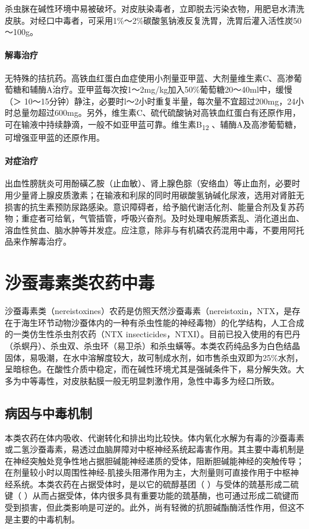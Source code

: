 杀虫脒在碱性环境中易被破坏。对皮肤染毒者，立即脱去污染衣物，用肥皂水清洗皮肤。对经口中毒者，可采用1\%～2\%碳酸氢钠液反复洗胃，洗胃后灌入活性炭50～100g。

\paragraph{解毒治疗}

无特殊的拮抗药。高铁血红蛋白血症使用小剂量亚甲蓝、大剂量维生素C、高渗葡萄糖和辅酶A治疗。亚甲蓝每次按1～2mg/kg加入50\%葡萄糖20～40ml中，缓慢（＞
10～15分钟）静注，必要时l～2小时重复半量，每次量不宜超过200mg，24小时总量勿超过600mg。另外，维生素C、硫代硫酸钠对高铁血红蛋白有还原作用，可在输液中持续静滴，一般不如亚甲蓝可靠。维生素B\textsubscript{12}
、辅酶A及高渗葡萄糖，可增强亚甲蓝的还原作用。

\paragraph{对症治疗}

出血性膀胱炎可用酚磺乙胺（止血敏）、肾上腺色腙（安络血）等止血剂，必要时用少量肾上腺皮质激素；在输液和利尿的同时用碳酸氢钠碱化尿液，选用对肾脏无损害的抗生素预防尿路感染。意识障碍者，给予脑代谢活化剂、能量合剂及复苏药物；重症者可给氧，气管插管，呼吸兴奋剂。及时处理电解质紊乱、消化道出血、溶血性贫血、脑水肿等并发症。应注意，除非与有机磷农药混用中毒，不要用阿托品来作解毒治疗。

\protect\hypertarget{text00143.html}{}{}

\section{沙蚕毒素类农药中毒}

沙蚕毒素类（nereistoxines）农药是仿照天然沙蚕毒素（nereistoxin，NTX，是存在于海生环节动物沙蚕体内的一种有杀虫性能的神经毒物）的化学结构，人工合成的一类仿生性杀虫剂农药（NTX
insecticides，NTXI）。目前已投入使用的有巴丹（杀螟丹）、杀虫双、杀虫环（易卫杀）和杀虫蟥等。本类农药纯品多为白色结晶固体，易吸潮，在水中溶解度较大，故可制成水剂，如市售杀虫双即为25\%水剂，呈暗棕色。在酸性介质中稳定，而在碱性环境尤其是强碱条件下，易分解失效。大多为中等毒性，对皮肤黏膜一般无明显刺激作用，急性中毒多为经口所致。

\subsection{病因与中毒机制}

本类农药在体内吸收、代谢转化和排出均比较快。体内氧化水解为有毒的沙蚕毒素或二氢沙蚕毒素，易透过血脑屏障对中枢神经系统起毒害作用。其主要中毒机制是在神经突触处竞争性地占据胆碱能神经递质的受体，阻断胆碱能神经的突触传导；在剂量较小时以周围性神经-肌接头阻滞作用为主，大剂量则可直接作用于中枢神经系统。本类农药在占据受体时，是以它的硫醇基团（{}
）与受体的巯基形成二硫键（{}
）从而占据受体，体内很多具有重要功能的巯基酶，也可通过形成二硫键而受到损害，但此类影响是可逆的。此外，尚有轻微的抗胆碱酯酶活性作用，但这不是主要的中毒机制。

